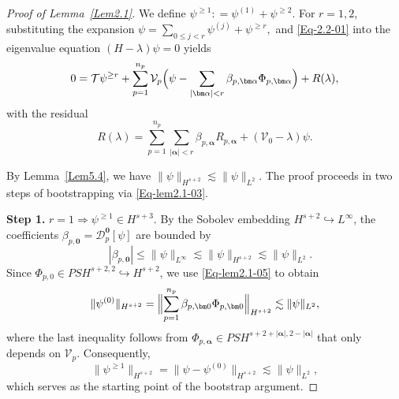 \documentclass{sn-jnl}%
\newcommand{\nm}[1]{\| #1 \|}
\numberwithin{equation}{section}
\theoremstyle{thmstyleone}%
\theoremstyle{thmstyletwo}%
\theoremstyle{thmstylethree}%
\begin{document}
\begin{proof}[Proof of Lemma~\ref{Lem2.1}] 
We define $\psi^{\geq 1}: = \psi^{(1)}+\psi^{\geq 2}.$
For $r=1,2$, substituting the expansion $\psi = \sum_{0\leq j<r}^{}\psi^{(j)} +\psi^{\geq r},$ and \eqref{Eq-2.2-01} into the eigenvalue equation $(H-\lambda)\psi = 0$ yields
\begin{equation}\label{Eq-lem2.1-03}
    0 = \mathcal{T}\psi^{\geq r} + \sum_{p=1}^{n_p} \mathcal{V}_p\Bigl(\psi - \sum_{|\bm \alpha|<r}\beta_{p,\bm \alpha}\Phi_{p,\bm \alpha}\Bigr) + R(\lambda),
\end{equation}
with the residual
\begin{equation}\label{Eq-lem2.1-04}
    R(\lambda) = \sum_{p=1}^{n_p}\sum_{|\bm \alpha|<r}\beta_{p,\bm \alpha}R_{p,\bm \alpha} + (\mathcal{V}_0 - \lambda)\psi.
\end{equation}

    By Lemma~\ref{Lem5.4}, we have $\|\psi\|_{H^{s+2}}\lesssim\nm{\psi}_{L^2}$. 
    The proof  proceeds in two steps of bootstrapping via \eqref{Eq-lem2.1-03}.
    
     \textbf{Step 1.} $r=1\Rightarrow \psi^{\geq 1}\in H^{s+3}$. By the Sobolev embedding $H^{s+2}\hookrightarrow L^{\infty}$, the coefficients $\beta_{p,\bm 0}= \mathcal{D}_{p}^{\bm 0}[\psi]$ are bounded by
    \begin{equation}\label{Eq-lem2.1-05}
        \quad |\beta_{p,\bm 0}| \leq \nm{\psi}_{L^{\infty}}\lesssim\|\psi\|_{H^{s+2}}\lesssim \|\psi\|_{L^2}.
    \end{equation}
    Since $\Phi_{p,0}\in PSH^{s+2,2}\hookrightarrow H^{s+2}$, we use \eqref{Eq-lem2.1-05} to obtain 
    \begin{equation}\label{Eq-lem2.1-06}
       \| \psi^{(0)} \|_{H^{s+2}} = \Bigl\| \sum_{p=1}^{n_p}\beta_{p,\bm 0}\Phi_{p,\bm 0}\Bigr\|_{H^{s+2}} \lesssim \|\psi\|_{L^2},
    \end{equation}
    where the last inequality follows from $\Phi_{p,\bm \alpha}\in PSH^{s+2+|\bm \alpha|,2-|\bm \alpha|}$ that only depends on $\mathcal{V}_p$. Consequently,
    \[
    \|\psi^{\geq 1}\|_{H^{s+2}}=\|\psi-\psi^{(0)}\|_{H^{s+2}}\lesssim \|\psi\|_{L^2},
    \]
    which serves as the starting point of the bootstrap argument. 
    

\end{proof}
\end{document}

